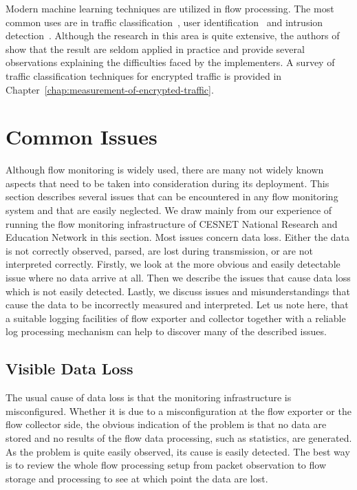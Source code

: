 Modern machine learning techniques are utilized in flow processing. The most common uses are in traffic classification~\cite{Velan-2015-Survey}, user identification~\cite{Verde-2014-No} and intrusion detection~\cite{Tsai-2009-Intrusion}. Although the research in this area is quite extensive, the authors of~\cite{Sommer-2010-Outside} show that the result are seldom applied in practice and provide several observations explaining the difficulties faced by the implementers. A survey of traffic classification techniques for encrypted traffic is provided in Chapter~\ref{chap:measurement-of-encrypted-traffic}.


\section{Common Issues}

Although flow monitoring is widely used, there are many not widely known aspects that need to be taken into consideration during its deployment. This section describes several issues that can be encountered in any flow monitoring system and that are easily neglected. We draw mainly from our experience of running the flow monitoring infrastructure of CESNET National Research and Education Network in this section. Most issues concern data loss. Either the data is not correctly observed, parsed, are lost during transmission, or are not interpreted correctly. Firstly, we look at the more obvious and easily detectable issue where no data arrive at all. Then we describe the issues that cause data loss which is not easily detected. Lastly, we discuss issues and misunderstandings that cause the data to be incorrectly measured and interpreted. Let us note here, that a suitable logging facilities of flow exporter and collector together with a reliable log processing mechanism can help to discover many of the described issues.

\subsection{Visible Data Loss}

The usual cause of data loss is that the monitoring infrastructure is misconfigured. Whether it is due to a misconfiguration at the flow exporter or the flow collector side, the obvious indication of the problem is that no data are stored and no results of the flow data processing, such as statistics, are generated. As the problem is quite easily observed, its cause is easily detected. The best way is to review the whole flow processing setup from packet observation to flow storage and processing to see at which point the data are lost.

